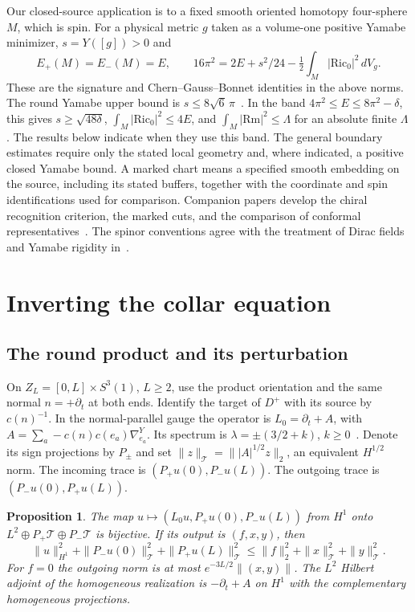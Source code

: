 \documentclass[11pt]{article}
\newtheorem{proposition}[theorem]{Proposition}
\theoremstyle{remark}
\newcommand{\Rm}{\mathrm{Rm}}
\newcommand{\Ric}{\mathrm{Ric}}
\begin{document}
Our closed-source application is to a fixed smooth oriented homotopy four-sphere \(M\), which is spin. For a physical metric \(g\) taken as a volume-one positive Yamabe minimizer, \(s=Y([g])>0\) and
\begin{equation}
 E_+(M)=E_-(M)=E,\qquad
 16\pi^2=2E+s^2/24-\tfrac12\int_M|\Ric_0|^2\,dV_g .
 \label{eq:band}
\end{equation}
These are the signature and Chern--Gauss--Bonnet identities in the above norms. The round Yamabe upper bound is \(s\le 8\sqrt6\,\pi\)~\cite{Schoen1984Yamabe}. In the band \(4\pi^2\le E\le8\pi^2-\delta\), this gives \(s\ge\sqrt{48\delta}\), \(\int_M|\Ric_0|^2\le4E\), and \(\int_M|\Rm|^2\le\Lambda\) for an absolute finite \(\Lambda\). The results below indicate when they use this band. The general boundary estimates require only the stated local geometry and, where indicated, a positive closed Yamabe bound. A marked chart means a specified smooth embedding on the source, including its stated buffers, together with the coordinate and spin identifications used for comparison. Companion papers develop the chiral recognition criterion, the marked cuts, and the comparison of conformal representatives~\cite{Baker2026TwistorSections,Baker2026MarkedNecks,Baker2026MarkedLimits}. The spinor conventions agree with the treatment of Dirac fields and Yamabe rigidity in~\cite{Baker2026DiracYamabe}.

\section{Inverting the collar equation}

\subsection{The round product and its perturbation}
On \(Z_L=[0,L]\times S^3(1)\), \(L\ge2\), use the product orientation and the same normal \(n=+\partial_t\) at both ends. Identify the target of \(D^+\) with its source by \(c(n)^{-1}\). In the normal-parallel gauge the operator is \(L_0=\partial_t+A\), with
\(A=\sum_a -c(n)c(e_a)\nabla^Y_{e_a}\).
Its spectrum is \(\lambda=\pm(3/2+k)\), \(k\ge0\)~\cite[Theorem~1]{Bar1996SphereDirac}. Denote its sign projections by \(P_\pm\) and set \(\|z\|_{\mathcal T}=\||A|^{1/2}z\|_2\), an equivalent \(H^{1/2}\) norm. The incoming trace is \((P_+u(0),P_-u(L))\). The outgoing trace is \((P_-u(0),P_+u(L))\).

\begin{proposition}\label{prop:round}
The map \(u\mapsto(L_0u,P_+u(0),P_-u(L))\) from \(H^1\) onto \(L^2\oplus P_+\mathcal T\oplus P_-\mathcal T\) is bijective. If its output is \((f,x,y)\), then
\begin{equation}
 \|u\|_{H^1}^2+\|P_-u(0)\|_{\mathcal T}^2+\|P_+u(L)\|_{\mathcal T}^2
 \le \|f\|_2^2+\|x\|_{\mathcal T}^2+\|y\|_{\mathcal T}^2 .
 \label{eq:roundinverse}
\end{equation}
For \(f=0\) the outgoing norm is at most \(e^{-3L/2}\|(x,y)\|\). The \(L^2\) Hilbert adjoint of the homogeneous realization is \(-\partial_t+A\) on \(H^1\) with the complementary homogeneous projections.
\end{proposition}
\end{document}
